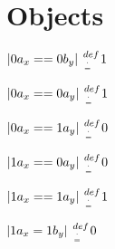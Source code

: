 \documentclass[11pt]{article}
\def \attrdef{ {\hspace{1mm} def \atop {. \atop = } \hspace{1mm}} }
\begin{document}
\section{Objects}
\begin{center}
$
|0a_x==0b_y| \attrdef 1
$
\end{center}
\begin{center}
$
|0a_x==0a_y| \attrdef 1
$
\end{center}
\begin{center}
$
|0a_x==1a_y| \attrdef 0
$
\end{center}
\begin{center}
$
|1a_x==0a_y| \attrdef 0
$
\end{center}
\begin{center}
$
|1a_x==1a_y| \attrdef 1
$
\end{center}
% 
\begin{center}
$
|1a_x = 1b_y| \attrdef 0
$
\end{center}
\end{document}
